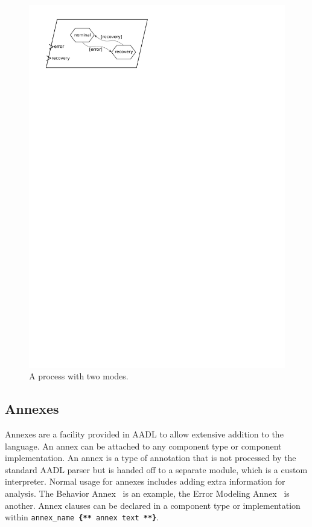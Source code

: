 \begin{figure}
\centering
\includegraphics[scale=0.75]{figs/modes}
\caption{A process with two modes.}
\label{fig:modes}
\end{figure}

\subsection{Annexes}
Annexes are a facility provided in AADL to allow extensive addition to
the language. An annex can be attached to any component type or
component implementation. An annex is a type of annotation that is not
processed by the standard AADL parser but is handed off to a separate
module, which is a custom interpreter. Normal usage for annexes
includes adding extra information for analysis. The Behavior
Annex~\cite{filali@iceccs07} is an example, the Error Modeling
Annex~\cite{aadlerrormodel, ana@corr07} is another. Annex clauses can
be declared in a component type or implementation within \texttt{annex\_name \textbf{\{**} annex text \textbf{**\}}}.

